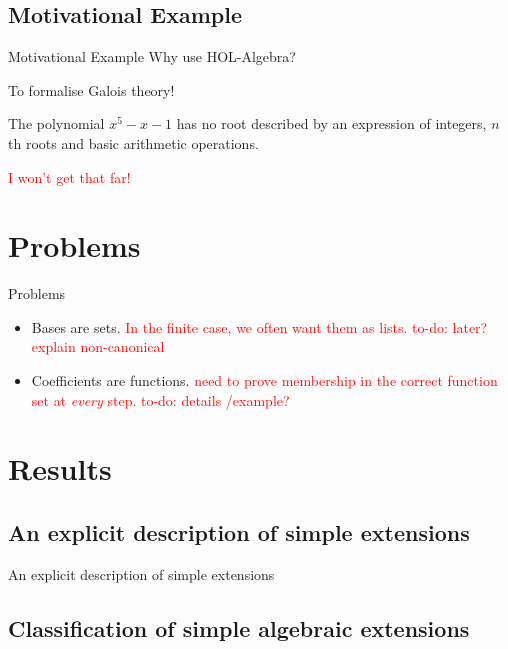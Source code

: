 \documentclass[%
	sans,
	12pt,
]{beamer}
\newcommand{\high}[1]{{\usebeamercolor[fg]{structure} #1}}
\newcommand{\bad}[1]{\textcolor{red}{#1}}
\begin{document}
\subsection{Motivational Example}
\begin{frame}{Motivational Example}
	Why use HOL-Algebra?\pause
	
	\high{To formalise Galois theory!}\pause
	\begin{theorem}
		\upshape
		The polynomial $x^5 − x − 1$ has no root described by an expression of integers, $n$th roots and basic arithmetic operations.
	\end{theorem}\pause
	\bad{I won't get that far!}
\end{frame}

\section{Problems}
\begin{frame}{Problems}
\begin{itemize}
\item Bases are sets.
\bad{In the finite case, we often want them as lists. to-do: later? explain non-canonical}
\item Coefficients are functions.
\bad{need to prove membership in the correct function set at \emph{every} step.
	 to-do: details /example?}
\end{itemize}
\end{frame}

\section{Results} %

\subsection{An explicit description of simple extensions}
\begin{frame}{An explicit description of simple extensions} %
\end{frame}

\subsection{Classification of simple algebraic extensions}
\end{document}
